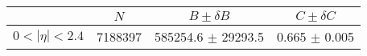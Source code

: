\begin{tabular}{lccc}
\hline
    &   $N$   & $B \pm \delta B$  &  $C \pm \delta C$ \\
\hline
$0 < |\eta| <2.4$              & 7188397    & 585254.6   $\pm$ 29293.5 & 0.665      $\pm$ 0.005 \\
\hline
\end{tabular}
